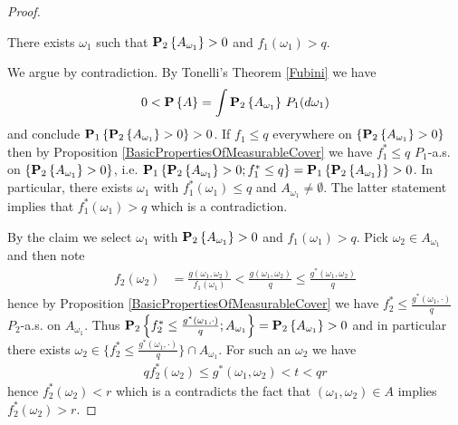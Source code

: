 \begin{proof}
\begin{clm} There exists $\omega_1$ such that $\sprobability{A_{\omega_1}}{2}>0$ and $f_1(\omega_1) > q$.
\end{clm}
We argue by contradiction.   By Tonelli's Theorem \ref{Fubini} we have
\begin{align*}
0 < \probability{A} = \int \sprobability{A_{\omega_1}}{2} \, P_1(d\omega_1)
\end{align*}
and conclude $\sprobability{\sprobability{A_{\omega_1}}{2}>0}{1}>0$.
 If $f_1 \leq q$ everywhere on $\lbrace \sprobability{A_{\omega_1}}{2}>0 \rbrace$ then by Proposition \ref{BasicPropertiesOfMeasurableCover} we have $f_1^* \leq q$ $P_1$-a.s. on $\lbrace \sprobability{A_{\omega_1}}{2}>0 \rbrace$, i.e. $\sprobability{\sprobability{A_{\omega_1}}{2}>0; f_1^* \leq q}{1}=\sprobability{\sprobability{A_{\omega_1}}{2}}{1}>0$.
In particular, there exists $\omega_1$ with $f_1^*(\omega_1) \leq q$ and $A_{\omega_1} \neq \emptyset$.  The latter statement implies that $f_1^*(\omega_1) > q$ which is a contradiction.

By the claim we select $\omega_1$ with $\sprobability{A_{\omega_1}}{2}>0$ and $f_1(\omega_1) > q$.  Pick $\omega_2 \in A_{\omega_1}$ and then note
\begin{align*}
f_2(\omega_2) &= \frac{g(\omega_1, \omega_2)}{f_1(\omega_1)} < \frac{g(\omega_1, \omega_2)}{q} \leq \frac{g^*(\omega_1, \omega_2)}{q} 
\end{align*}
hence by Proposition \ref{BasicPropertiesOfMeasurableCover} we have $f_2^* \leq \frac{g^*(\omega_1, \cdot)}{q}$ $P_2$-a.s. on $A_{\omega_1}$.  Thus $\sprobability{f_2^* \leq \frac{g^*(\omega_1, \cdot)}{q}; A_{\omega_1}} {2} = \sprobability{A_{\omega_1}} {2} >0$ and in particular there exists $\omega_2 \in \lbrace f_2^* \leq \frac{g^*(\omega_1, \cdot)}{q} \rbrace \cap A_{\omega_1}$.  For such an
$\omega_2$ we have 
\begin{align*}
q f_2^*(\omega_2) \leq g^*(\omega_1, \omega_2) < t < qr
\end{align*}
hence $f_2^*(\omega_2)<r$ which is a contradicts the fact that $(\omega_1,\omega_2) \in A$ implies $f_2^*(\omega_2)>r$.
\end{proof}

